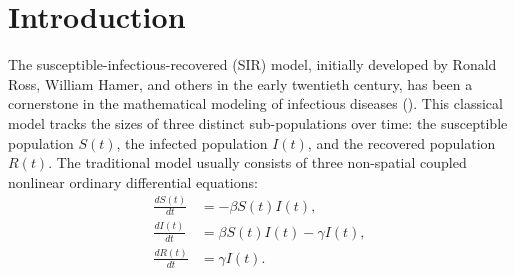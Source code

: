 \documentclass[sn-basic]{sn-jnl}%
\theoremstyle{thmstyleone}%
\theoremstyle{thmstyletwo}%
\theoremstyle{thmstylethree}%
\numberwithin{equation}{theorem}
\begin{document}
\section{Introduction}\label{sec1}

The susceptible-infectious-recovered (SIR) model, initially developed by Ronald Ross, William Hamer, and others in the early twentieth century, has been a cornerstone in the mathematical modeling of infectious diseases (\citep{24}). This classical model tracks the sizes of three distinct sub-populations over time: the susceptible population $S(t)$, the infected population $I(t)$, and the recovered population $R(t)$. The traditional model usually consists of three non-spatial coupled nonlinear ordinary differential equations:
\begin{align*}
\displaystyle \frac{dS(t)}{dt} &= - \beta S(t)I(t),\\
\displaystyle \frac{dI(t)}{dt} &= \beta S(t)I(t) - \gamma I(t),\\
\displaystyle \frac{dR(t)}{dt} &= \gamma I(t).
\end{align*} 
\end{document}
